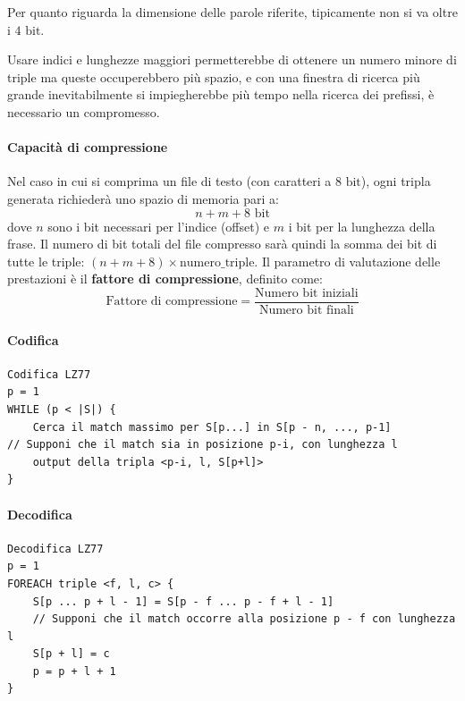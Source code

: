 Per quanto riguarda la dimensione delle parole riferite, tipicamente non si va oltre i $4\text{ bit}$.

Usare indici e lunghezze maggiori permetterebbe di ottenere un numero minore di triple ma queste occuperebbero più spazio, e con una finestra di ricerca più grande inevitabilmente si impiegherebbe più tempo nella ricerca dei prefissi, è necessario un compromesso.

\paragraph{Capacità di compressione}
Nel caso in cui si comprima un file di testo (con caratteri a $8 \text{ bit}$), ogni tripla generata richiederà uno spazio di memoria pari a:
\[ n + m + 8 \text{ bit} \]
dove $n$ sono i bit necessari per l'indice (offset) e $m$ i bit per la lunghezza della frase.
Il numero di bit totali del file compresso sarà quindi la somma dei bit di tutte le triple: $(n + m + 8) \times \text{numero\_triple}$.
Il parametro di valutazione delle prestazioni è il \textbf{fattore di compressione}, definito come:
\[ \text{Fattore di compressione} = \frac{\text{Numero bit iniziali}}{\text{Numero bit finali}} \]

\paragraph{Codifica}

\newcommand{\triple}[1]{\textcolor{blue}{#1}}
\newcommand{\lb}{\textcolor{red}{\{}}
\newcommand{\rb}{\textcolor{red}{\}}}
\begin{lstlisting}
Codifica LZ77
p = 1
WHILE (p < |S|) {
    Cerca il match massimo per S[p...] in S[p - n, ..., p-1]
// Supponi che il match sia in posizione p-i, con lunghezza l
    output della tripla <p-i, l, S[p+l]>
}
\end{lstlisting}



\paragraph{Decodifica}
\begin{lstlisting}
Decodifica LZ77
p = 1
FOREACH triple <f, l, c> {
    S[p ... p + l - 1] = S[p - f ... p - f + l - 1]
    // Supponi che il match occorre alla posizione p - f con lunghezza l
    S[p + l] = c
    p = p + l + 1
}
\end{lstlisting}


